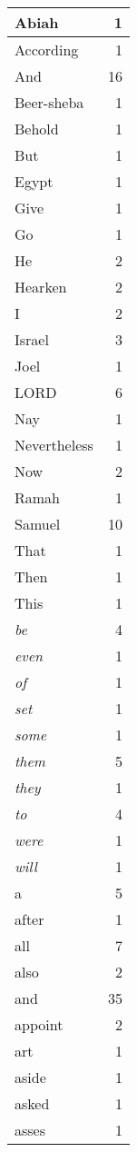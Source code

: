 \begin{center}
\begin{longtable}{l|r}
\hline \hline
\endlastfoot
Abiah & 1 \\ \hline
According & 1 \\ \hline
And & 16 \\ \hline
Beer-sheba & 1 \\ \hline
Behold & 1 \\ \hline
But & 1 \\ \hline
Egypt & 1 \\ \hline
Give & 1 \\ \hline
Go & 1 \\ \hline
He & 2 \\ \hline
Hearken & 2 \\ \hline
I & 2 \\ \hline
Israel & 3 \\ \hline
Joel & 1 \\ \hline
LORD & 6 \\ \hline
Nay & 1 \\ \hline
Nevertheless & 1 \\ \hline
Now & 2 \\ \hline
Ramah & 1 \\ \hline
Samuel & 10 \\ \hline
That & 1 \\ \hline
Then & 1 \\ \hline
This & 1 \\ \hline
\emph{be} & 4 \\ \hline
\emph{even} & 1 \\ \hline
\emph{of} & 1 \\ \hline
\emph{set} & 1 \\ \hline
\emph{some} & 1 \\ \hline
\emph{them} & 5 \\ \hline
\emph{they} & 1 \\ \hline
\emph{to} & 4 \\ \hline
\emph{were} & 1 \\ \hline
\emph{will} & 1 \\ \hline
a & 5 \\ \hline
after & 1 \\ \hline
all & 7 \\ \hline
also & 2 \\ \hline
and & 35 \\ \hline
appoint & 2 \\ \hline
art & 1 \\ \hline
aside & 1 \\ \hline
asked & 1 \\ \hline
asses & 1 \\ \hline

\end{longtable}
\end{center}
